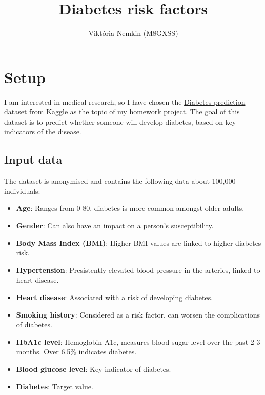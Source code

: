 \documentclass[11pt]{article}
\title{Diabetes risk factors}
\author{Viktória Nemkin (M8GXSS)}
\providecommand{\tightlist}{%
      \setlength{\itemsep}{0pt}\setlength{\parskip}{0pt}}
\begin{document}
    
    \maketitle
    \tableofcontents
    

    
    \hypertarget{setup}{%
\section{Setup}\label{setup}}

I am interested in medical research, so I have chosen the
\href{https://www.kaggle.com/datasets/iammustafatz/diabetes-prediction-dataset}{Diabetes
prediction dataset} from Kaggle as the topic of my homework project. The
goal of this dataset is to predict whether someone will develop
diabetes, based on key indicators of the disease.

    \hypertarget{input-data}{%
\subsection{Input data}\label{input-data}}

The dataset is anonymised and contains the following data about 100,000
individuals:

\begin{itemize}
\tightlist
\item
  \textbf{Age}: Ranges from 0-80, diabetes is more common amongst older
  adults.
\item
  \textbf{Gender}: Can also have an impact on a person's susceptibility.
\item
  \textbf{Body Mass Index (BMI)}: Higher BMI values are linked to higher
  diabetes risk.
\item
  \textbf{Hypertension}: Presistently elevated blood pressure in the
  arteries, linked to heart disease.
\item
  \textbf{Heart disease}: Associated with a risk of developing diabetes.
\item
  \textbf{Smoking history}: Considered as a risk factor, can worsen the
  complications of diabetes.
\item
  \textbf{HbA1c level}: Hemoglobin A1c, measures blood sugar level over
  the past 2-3 months. Over 6.5\% indicates diabetes.
\item
  \textbf{Blood glucose level}: Key indicator of diabetes.
\item
  \textbf{Diabetes}: Target value.
\end{itemize}
\end{document}
